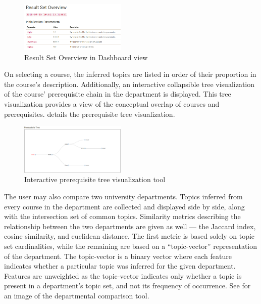 
\begin{figure}
  \centering
  \includegraphics[width=0.45\textwidth]{figures/screenshots/dashboard/result_set_overview.png}
  \caption{Result Set Overview in Dashboard view\label{fig:dashboard}}
\end{figure}


On selecting a course, the inferred topics are listed in order of their proportion in the course's description.
Additionally, an interactive collapsible tree visualization of the course' prerequisite chain in the department is displayed.
This tree visualization provides a view of the conceptual overlap of courses and prerequisites.
 details the prerequisite tree visualization.


\begin{figure}
  \centering
  \includegraphics[width=0.45\textwidth]{figures/screenshots/course/prerequisite_detail.png}
  \caption{Interactive prerequisite tree visualization tool\label{fig:prerequisite-detail}}
\end{figure}


The user may also compare two university departments.
Topics inferred from every course in the department are collected and displayed side by side, along with the intersection set of common topics.
Similarity metrics describing the relationship between the two departments are given as well --- the Jaccard index, cosine similarity, and euclidean distance.
The first metric is based solely on topic set cardinalities, while the remaining are based on a ``topic-vector'' representation of the department.
The topic-vector is a binary vector where each feature indicates whether a particular topic was inferred for the given department.
Features are unweighted as the topic-vector indicates only whether a topic is present in a department's topic set, and not its frequency of occurrence.
See  for an image of the departmental comparison tool.


